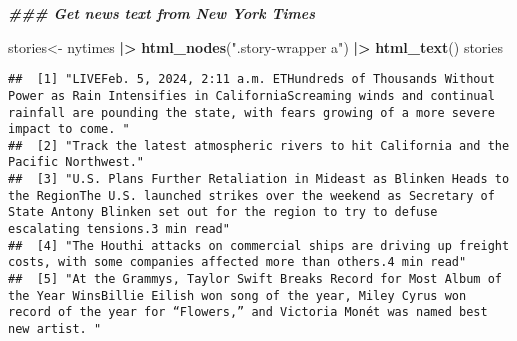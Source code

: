 \documentclass[
]{article}
\newenvironment{Shaded}{\begin{snugshade}}{\end{snugshade}}
\newcommand{\DocumentationTok}[1]{\textcolor[rgb]{0.56,0.35,0.01}{\textbf{\textit{#1}}}}
\newcommand{\FunctionTok}[1]{\textcolor[rgb]{0.13,0.29,0.53}{\textbf{#1}}}
\newcommand{\NormalTok}[1]{#1}
\newcommand{\OtherTok}[1]{\textcolor[rgb]{0.56,0.35,0.01}{#1}}
\newcommand{\SpecialCharTok}[1]{\textcolor[rgb]{0.81,0.36,0.00}{\textbf{#1}}}
\newcommand{\StringTok}[1]{\textcolor[rgb]{0.31,0.60,0.02}{#1}}
\begin{document}
\begin{Shaded}
\begin{Highlighting}[]
\DocumentationTok{\#\#\# Get news text from New York Times }

\NormalTok{stories}\OtherTok{\textless{}{-}}\NormalTok{ nytimes }\SpecialCharTok{|\textgreater{}} 
  \FunctionTok{html\_nodes}\NormalTok{(}\StringTok{".story{-}wrapper a"}\NormalTok{) }\SpecialCharTok{|\textgreater{}} 
  \FunctionTok{html\_text}\NormalTok{()}
\NormalTok{stories}
\end{Highlighting}
\end{Shaded}

\begin{verbatim}
##  [1] "LIVEFeb. 5, 2024, 2:11 a.m. ETHundreds of Thousands Without Power as Rain Intensifies in CaliforniaScreaming winds and continual rainfall are pounding the state, with fears growing of a more severe impact to come. "                                                                                                                                                                                               
##  [2] "Track the latest atmospheric rivers to hit California and the Pacific Northwest."                                                                                                                                                                                                                                                                                                                                     
##  [3] "U.S. Plans Further Retaliation in Mideast as Blinken Heads to the RegionThe U.S. launched strikes over the weekend as Secretary of State Antony Blinken set out for the region to try to defuse escalating tensions.3 min read"                                                                                                                                                                                       
##  [4] "The Houthi attacks on commercial ships are driving up freight costs, with some companies affected more than others.4 min read"                                                                                                                                                                                                                                                                                        
##  [5] "At the Grammys, Taylor Swift Breaks Record for Most Album of the Year WinsBillie Eilish won song of the year, Miley Cyrus won record of the year for “Flowers,” and Victoria Monét was named best new artist. "                                                                                                                                                                                                       

\end{verbatim}
\end{document}
